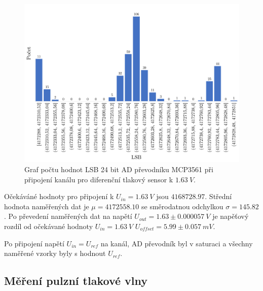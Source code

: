 \begin{figure}[H]
    \caption{Graf počtu hodnot LSB 24 bit AD převodníku MCP3561 při připojení kanálu
        pro diferenční tlakový sensor k  $1.63 \ V$.}
    \includegraphics[width=1\textwidth]{graphs/mcp_16.png}
\end{figure}
Očekáváné hodnoty pro připojení k $U_{in} = 1.63 \ V$ jsou $4168728.97$. Střední hodnota naměřených dat je $\mu = 4172558.10$ se směrodatnou odchylkou $\sigma = 145.82$. Po převedení naměřených dat na napětí $U_{out} = 1.63 \pm 0.000057\ V$ je napěťový rozdíl od očekávané hodnoty $U_{in} = 1.63 \ V$
$U_{offset} = 5.99 \pm 0.057 \ mV$.
\par
Po připojení napětí $U_{in} = U_{ref}$ na kanál, AD převodník byl v saturaci a všechny naměřené vzorky byly s hodnout $U_{ref}$.


\subsection{Měření pulzní tlakové vlny}





